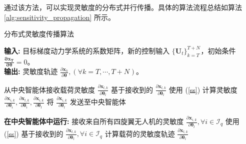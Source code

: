 \documentclass[lang=chs, degree=master, blindreview=true, winfonts=true]{yanputhesis}
\begin{document}
通过该方法，可以实现灵敏度的分布式并行传播。具体的算法流程总结如算法 \ref{alg:sensitivity_propagation} 所示。

\begin{algorithm}[h]
    \caption{分布式灵敏度传播算法}
    \label{alg:sensitivity_propagation}
    \textbf{输入:} 目标梯度动力学系统的系数矩阵，新的控制输入 $\{\bm{U}_t\}_{k=T}^{T+N_{\text{}}}$，初始条件 $\bm{\frac{\partial \bm{x}_{T}}{\partial \bm{\theta}}} = 0$。\\
    \textbf{输出:} 灵敏度轨迹 ${\frac{\partial \bm{x}_{k}}{\partial \bm{\theta}}}, (\forall k = T, \cdots, T+N_{\text{}})$。

    \begin{algorithmic}[1]
            \State 从中央智能体接收载荷灵敏度 $\frac{\partial \bm{x}_{l,k}}{\partial \bm{\theta}_l}$
            \State 基于接收到的 $\frac{\partial \bm{x}_{l,k}}{\partial \bm{\theta}_l}$ 使用 (\ref{ss}) 计算灵敏度 $\frac{\partial \bm{x}_{i,k}}{\partial \bm{\theta}_i}, \frac{\partial \bm{x}_{l,k}}{\partial \bm{\theta}_i}, \frac{\partial \bm{x}_{i,k}}{\partial \bm{\theta}_l}$
            \State 将 $\frac{\partial \bm{x}_{i,k}}{\partial \bm{\theta}_l}$ 发送至中央智能体
        \EndFor
    \EndFor
    
        \State \textbf{在中央智能体中运行:}
        \State 接收来自所有四旋翼无人机的灵敏度 $\frac{\partial \bm{x}_{i,k}}{\partial \bm{\theta}_l}, \forall i \in \mathcal{I}_q$
        \State 使用 (\ref{ss}) 基于接收到的 $\frac{\partial \bm{x}_{l,k}}{\partial \bm{\theta}_l}, \forall i \in \mathcal{I}_q$ 计算载荷的灵敏度轨迹 $\frac{\partial \bm{x}_{l,k}}{\partial \bm{\theta}_l}$
    \EndFor
    \end{algorithmic}
\end{algorithm}


\end{document}
